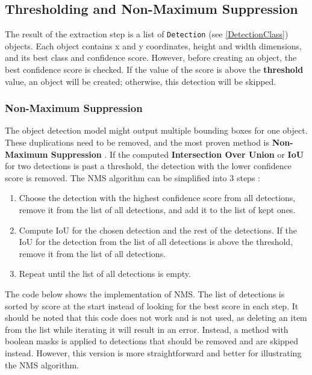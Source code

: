 \subsection{Thresholding and Non-Maximum Suppression}
The result of the extraction step is a list of \texttt{Detection} (see \ref{DetectionClass}) objects. Each object contains x and y coordinates, height and width dimensions, and its best class and confidence score. However, before creating an object, the best confidence score is checked. If the value of the score is above the \textbf{threshold} value, an object will be created; otherwise, this detection will be skipped.

\subsubsection{Non-Maximum Suppression}
The object detection model might output multiple bounding boxes for one object. These duplications need to be removed, and the most proven method is \textbf{Non-Maximum Suppression} \cite{nms}. If the computed \textbf{Intersection Over Union} or \textbf{IoU} for two detections is past a threshold, the detection with the lower confidence score is removed. The NMS algorithm can be simplified into 3 steps \cite{nms}:

\begin{enumerate}
  \item {Choose the detection with the highest confidence score from all detections, remove it from the list of all detections, and add it to the list of kept ones.}
  
  \item {Compute IoU for the chosen detection and the rest of the detections. If the IoU for the detection from the list of all detections is above the threshold, remove it from the list of all detections.}
  
  \item {Repeat until the list of all detections is empty.}
\end{enumerate}

The code below shows the implementation of NMS. The list of detections is sorted by score at the start instead of looking for the best score in each step. It should be noted that this code does not work and is not used, as deleting an item from the list while iterating it  will result in an error. Instead, a method with boolean masks is applied to detections that should be removed and are skipped instead. However, this version is more straightforward and better for illustrating the NMS algorithm.

